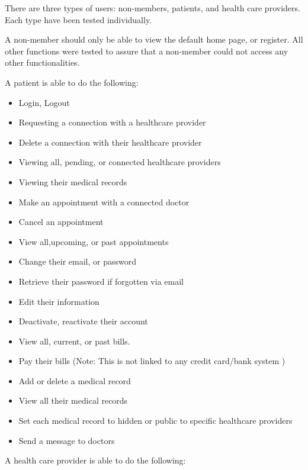 \documentclass[12pt]{report}
\begin{document}
There are three types of users: non-members, patients, and health care providers. Each type have been tested individually.

A non-member should only be able to view the default home page, or register. All other functions were tested to assure that a non-member could not access any other functionalities. 

A patient is able to do the following:
\begin{itemize}
\item Login, Logout
\item Requesting a connection with a healthcare provider
\item Delete a connection with their healthcare provider
\item Viewing all, pending, or connected healthcare providers
\item Viewing their medical records
\item Make an appointment with a connected doctor
\item Cancel an appointment 
\item View all,upcoming, or past appointments
\item Change their email, or password
\item Retrieve their password if forgotten via email
\item Edit their information
\item Deactivate, reactivate their account
\item View all, current, or past bills.
\item Pay their bills (Note: This is not linked to any credit card/bank system ) 
\item Add or delete a medical record
\item View all their medical records
\item Set each medical record to hidden or public to specific healthcare providers
\item Send a message to doctors
\end{itemize}
A health care provider is able to do the following:
\end{document}
